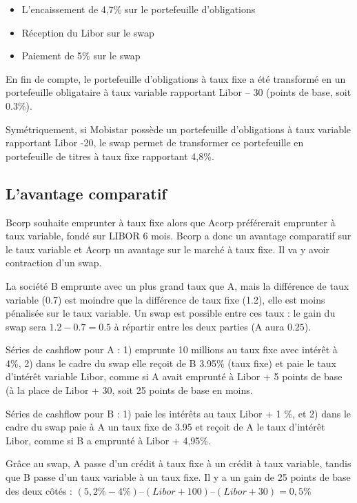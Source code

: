 	\begin{itemize}
		\item L'encaissement de 4,7\% sur le portefeuille d'obligations 
		\item Réception du Libor sur le swap 
		\item Paiement de 5\% sur le swap 
	\end{itemize}

	
	En fin de compte, le portefeuille d'obligations à taux fixe a été transformé en un portefeuille obligataire à taux variable rapportant Libor – 30 (points de base, soit 0.3\%). 

	Symétriquement, si Mobistar possède un portefeuille d'obligations à taux variable rapportant Libor -20, le swap permet de transformer ce portefeuille en portefeuille de titres à taux fixe rapportant 4,8\%.
	
	\subsection{L'avantage comparatif}
	
	
	Bcorp souhaite emprunter à taux fixe alors que Acorp préférerait emprunter à taux variable, fondé sur LIBOR 6 mois. Bcorp a donc un avantage comparatif sur le taux variable et Acorp un avantage sur le marché à taux fixe. Il va y avoir contraction d'un swap.
	
	La société B emprunte avec un plus grand taux que A, mais la différence de taux variable (0.7) est moindre que la différence de taux fixe (1.2), elle est moins pénalisée sur le taux variable. Un swap est possible entre ces taux : le gain du swap sera $1.2 - 0.7 = 0.5$ à répartir entre les deux parties (A aura $0.25$).
	
	Séries de cashflow pour A : 1) emprunte 10 millions au taux fixe avec intérêt à 4\%, 2) dans le cadre du swap elle reçoit de B 3.95\% (taux fixe) et paie le taux d'intérêt variable Libor, comme si A avait emprunté à Libor + 5 points de base (à la place de Libor + 30, soit 25 points de base en moins.
	
	Séries de cashflow pour B : 1) paie les intérêts au taux Libor + 1 \%, et 2) dans le cadre du swap paie à A un taux fixe de 3.95 et reçoit de A le taux d'intérêt Libor, comme si B a emprunté à Libor + 4,95\%.
	

	Grâce au swap, A passe d'un crédit à taux fixe à un crédit à taux variable, tandis que B passe d'un taux variable à un taux fixe. Il y a un gain de 25 points de base des deux côtés : $(5,2\%-4\%) – (Libor + 100) – (Libor + 30) = 0,5\%$
	
